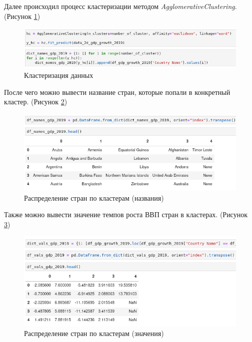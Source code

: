 \documentclass[14pt,fleqn]{extarticle}
\begin{document}
	\newpage
	
	Далее происходил процесс кластеризации методом \textit{AgglomerativeClustering}. (Рисунок \ref{fig:cluster_clustering})
	
	\begin{figure}[h]
		\centering \includegraphics[scale=0.5]{cluster_clustering}
		\caption{Кластеризация данных}
		\label{fig:cluster_clustering}
	\end{figure}

	После чего можно вывести название стран, которые попали в конкретный кластер. (Рисунок \ref{fig:cluster_country_names})
	
	\begin{figure}[h]
		\centering \includegraphics[scale=0.5]{cluster_country_names}
		\caption{Распределение стран по кластерам (названия)}
		\label{fig:cluster_country_names}
	\end{figure}

	Также можно вывести значение темпов роста ВВП стран в кластерах. (Рисунок \ref{fig:cluster_country_values})
	
	\begin{figure}[h]
		\centering \includegraphics[scale=0.5]{cluster_country_values}
		\caption{Распределение стран по кластерам (значения)}
		\label{fig:cluster_country_values}
	\end{figure}
	
\end{document}
